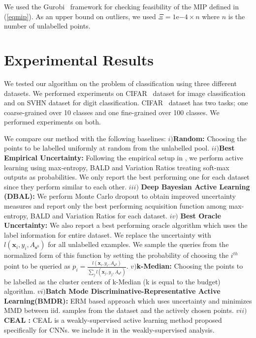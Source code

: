 \documentclass{article} \usepackage{iclr2018_conference,times}
\begin{document}
We used the Gurobi~\citep{gurobi} framework for checking feasibility of the MIP defined in (\ref{eqmip}). As an upper bound on outliers, we used $\Xi=1\mathrm{e}{-4} \times n$ where $n$ is the
number of unlabelled points.


\section{Experimental Results} \label{sec:exp} We tested our algorithm on the problem of classification using three
different datasets. We performed experiments on CIFAR~\citep{cifar} dataset for
image classification and on SVHN\citep{svhn} dataset for digit classification. CIFAR~\citep{cifar} dataset has two
tasks; one coarse-grained over 10 classes and one fine-grained over 100 classes. We performed experiments on both.

We compare our method with the following baselines: $i)$\textbf{Random:} Choosing the points to be labelled uniformly at
random from the unlabelled pool. $ii)$\textbf{Best Empirical Uncertainty:} Following the empirical setup in
\citep{gal_active}, we perform active learning using max-entropy, BALD and Variation Ratios treating soft-max outputs as
probabilities. We only report the best performing one for each dataset since they perform similar to each other. $iii)$
\textbf{Deep Bayesian Active Learning (DBAL)\citep{gal_active}:} We perform Monte Carlo dropout to obtain improved uncertainty measures and report
only the best performing acquisition function among max-entropy, BALD and Variation Ratios for each dataset. $iv)$
\textbf{Best Oracle Uncertainty:} We also report a best performing oracle algorithm which uses the label information for
entire dataset. We replace the uncertainty with $l(\mathbf{x}_i,y_i,A_{\mathbf{s}^0})$ for all unlabelled examples. We
sample the queries from the normalized form of this function by setting the probability of choosing the $i^{th}$ point
to be queried as $p_i=\frac{l(\mathbf{x}_i,y_i,A_{\mathbf{s}^0})}{\sum_j l(\mathbf{x}_j,y_j,A_{\mathbf{s}^0})}$. $v)$\textbf{k-Median:} Choosing the points to be labelled as the cluster centers of k-Median (k is equal to the budget) algorithm. $vi)$\textbf{Batch Mode Discriminative-Representative Active Learning(BMDR)\citep{kdd13}:} ERM based approach which uses uncertainty and minimizes MMD between iid. samples from the dataset and the actively chosen points. $vii)$\textbf{CEAL \citep{wang2016cost}:} CEAL \citep{wang2016cost} is a weakly-supervised active learning method proposed
specifically for CNNs. we include it in the weakly-supervised analysis.
\end{document}

